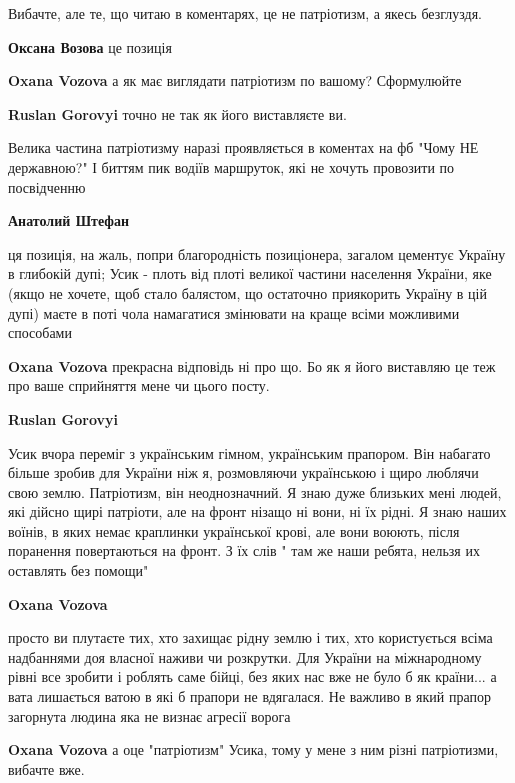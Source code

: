 \begin{itemize}
Вибачте, але те, що читаю в коментарях, це не патріотизм, а якесь безглуздя.

\begin{itemize} %

\textbf{Оксана Возова} це позиція

\textbf{Oxana Vozova} а як має виглядати патріотизм по вашому? Сформулюйте

\textbf{Ruslan Gorovyi} точно не так як його виставляєте ви.

Велика частина патріотизму наразі проявляється в коментах на фб "Чому НЕ
державною?" І биттям пик водіїв маршруток, які не хочуть провозити по
посвідченню


\textbf{Анатолий Штефан} 

ця позиція, на жаль, попри благородність позиціонера, загалом цементує Україну
в глибокій дупі; Усик - плоть від плоті великої частини населення України, яке
(якщо не хочете, щоб стало балястом, що остаточно приякорить Україну в цій
дупі) маєте в поті чола намагатися змінювати на краще всіми можливими способами


\textbf{Oxana Vozova} прекрасна відповідь ні про що. Бо як я його виставляю це
теж про ваше сприйняття мене чи цього посту.

\textbf{Ruslan Gorovyi} 

Усик вчора переміг з українським гімном, українським прапором. Він набагато
більше зробив для України ніж я, розмовляючи українською і щиро люблячи свою
землю. Патріотизм, він неоднозначний. Я знаю дуже близьких мені людей, які
дійсно щирі патріоти, але на фронт нізащо ні вони, ні їх рідні. Я знаю наших
воїнів, в яких немає краплинки української крові, але вони воюють, після
поранення повертаються на фронт. З їх слів " там же наши ребята, нельзя их
оставлять без помощи"

\textbf{Oxana Vozova} 

просто ви плутаєте тих, хто захищає рідну землю і тих, хто користується всіма
надбаннями доя власної наживи чи розкрутки. Для України на міжнародному рівні
все зробити і роблять саме бійці, без яких нас вже не було б як країни... а вата
лишається ватою в які б прапори не вдягалася. Не важливо в який прапор
загорнута людина яка не визнає агресії ворога


\textbf{Oxana Vozova} а оце "патріотизм" Усика, тому у мене з ним різні патріотизми, вибачте вже.


\end{itemize}
\end{itemize}
